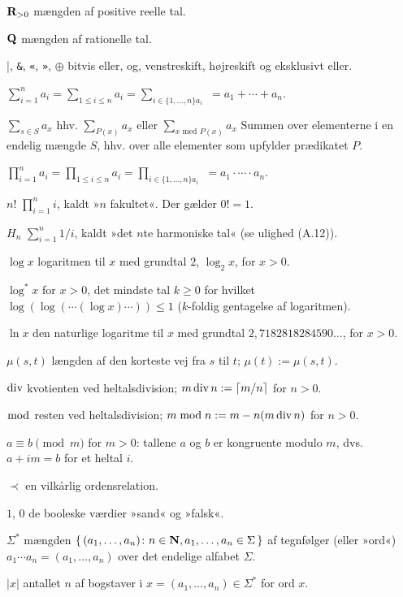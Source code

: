 \begin{mydescription}
\item[$\mathbf R_{>0}$] mængden af positive reelle tal.
\item[$\mathbf Q$] mængden af rationelle tal.
\item[|, \texttt{\&},  \texttt{«}, \texttt{»}, $\oplus$] bitvis eller, og, venstreskift, højreskift og eksklusivt eller.
\item[$\sum_{i=1}^n a_i = \sum_{1\leq i\leq n} a_i = \sum_{i\in\{1,\ldots,n\} a_i}$] $=a_1+\cdots+a_n$.
\item[$\sum_{s\in S} a_x$ hhv. $\sum_{P(x)}a_x$ eller $\sum_{x\text{ med } P(x)} a_x$] Summen over elementerne i en endelig mængde $S$, hhv. over alle elementer som upfylder prædikatet $P$.
\item[$\prod_{i=1}^n a_i = \prod_{1\leq i\leq n} a_i = \prod_{i\in\{1,\ldots,n\} a_i}$] $=a_1\cdot\cdots\cdot a_n$.
\item[$n!$] $\prod_{i=1}^ni$, kaldt »$n$ fakultet«. Der gælder $0!=1$.
\item[$H_n$] $\sum_{i=1}^n1/i$, kaldt »det $n$te harmoniske tal« (se ulighed (A.12)).
\item[$\log x$] logaritmen til $x$ med grundtal $2$, $\log_2x$, for $x>0$.
\item[$\log^* x$] for $x>0$, det mindste tal $k\geq 0$ for hvilket $\log(\log(\cdots (\log x)\cdots ))\leq 1$ ($k$-foldig gentagelse af logaritmen).
\item[$\ln x$] den naturlige logaritme til $x$ med grundtal $2,7182818284590\ldots$, for $x>0$.
\item [$\mu(s,t)$] længden af den korteste vej fra $s$ til $t$; $\mu(t):=\mu(s,t)$.
\item[$\operatorname{div}$] kvotienten ved heltalsdivision; $m\operatorname{div} n := \lceil m/n\rceil $ for $n>0$.
\item[$\bmod$] resten ved heltalsdivision; $m\bmod n := m - n(m\operatorname{div} n)$ for $n>0$.
\item[$a\equiv b\pmod m$] for $m>0$: tallene $a$ og $b$ er kongruente modulo $m$, dvs. $a+im =b $ for et heltal $i$.
\item[$\prec$] en vilkårlig ordensrelation.
\item[$1$, $0$] de booleske værdier »sand« og »falsk«. 
\item[$\Sigma^*$] mængden $\{\,(a_1,\ldots,a_n) \colon n\in \mathbf N, a_1,\ldots, a_n\in \Sigma\,\}$ af tegnfølger (eller »ord«) $a_1\cdots a_n=(a_1,\ldots,a_n)$ over det endelige alfabet $\Sigma$. 
\item[$|x|$] antallet $n$ af bogstaver i $x=(a_1,\ldots,a_n)\in \Sigma^*$ for ord $x$.

\end{mydescription}

